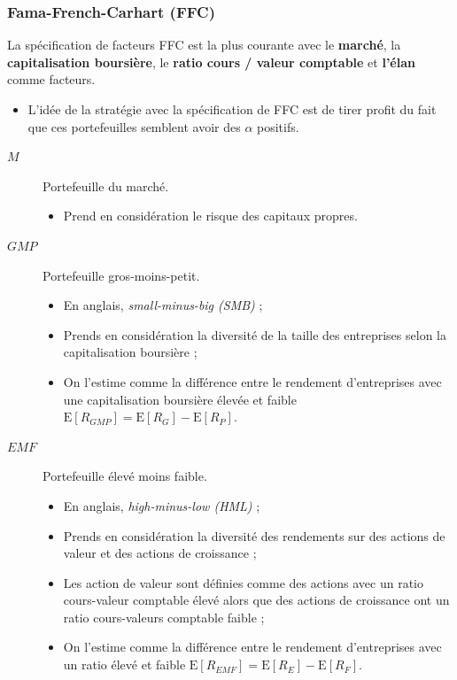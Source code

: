\documentclass[10pt, french]{article}
\begin{document}
\begin{multicols*}{2}
\subsubsection{Fama-French-Carhart (FFC)}
\begin{definitionNOHFILL}[Notation]
La spécification de facteurs FFC est la plus courante avec le \textbf{marché}, la \textbf{capitalisation boursière}, le \textbf{ratio cours / valeur comptable} et \textbf{l'élan} comme facteurs.
\begin{itemize}
	\item	L'idée de la stratégie avec la spécification de FFC est de tirer profit du fait que ces portefeuilles semblent avoir des $\alpha$ positifs.
\end{itemize}

\begin{description}
	\item[$M$]	Portefeuille du marché.
		\begin{itemize}
		\item	Prend en considération le risque des capitaux propres.
		\end{itemize}
	\item[$GMP$]	Portefeuille gros-moins-petit.
		\begin{itemize}
		\item	En anglais, \og \textit{small-minus-big (SMB)} \fg{} ;
		\item	Prends en considération la diversité de la taille des entreprises selon la capitalisation boursière ;
		\item	On l'estime comme la différence entre le rendement d'entreprises avec une capitalisation boursière élevée et faible $\text{E}[R_{GMP}]	=	\text{E}[R_{G}]	-	\text{E}[R_{P}]$.
		\end{itemize}
	\item[$EMF$]	Portefeuille élevé moins faible.
		\begin{itemize}
		\item	En anglais, \og \textit{high-minus-low (HML)} \fg{} ;
		\item	Prends en considération la diversité des rendements sur des actions de valeur et des actions de croissance ;
		\item	Les action de valeur sont définies comme des actions avec un ratio cours-valeur comptable élevé alors que des actions de croissance ont un ratio cours-valeurs comptable faible ;
		\item	On l'estime comme la différence entre le rendement d'entreprises avec un ratio élevé et faible $\text{E}[R_{EMF}]	=	\text{E}[R_{E}]	-	\text{E}[R_{F}]$.

\end{itemize}
\end{description}
\end{definitionNOHFILL}
\end{multicols*}
\end{document}
